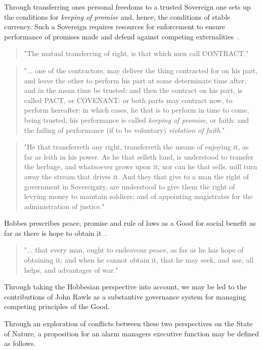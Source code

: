 \documentclass[11pt, oneside]{book}   	%
\begin{document}
Through transferring ones personal freedoms to a trusted Sovereign one sets up the conditions for \emph{keeping of promise} and, hence, the conditions of stable currency. Such a Sovereign requires resources for enforcement to ensure performance of promises made and defend against competing externalities~\cite{th1}.

\begin{quote}
"The mutual transferring of right, is that which men call CONTRACT."
\end{quote}
\begin{quote}
"... one of the contractors, may deliver the thing contracted for on his part, and leave the other to perform his part at some determinate time after, and in the mean time be trusted: and then the contract on his part, is called PACT, or COVENANT: or both parts may contract now, to perform hereafter: in which cases, he that is to perform in time to come, being trusted, his performance is called \emph{keeping of promise}, or faith: and the failing of performance (if to be voluntary) \emph{violation of faith}."
\end{quote}

\pagebreak

\begin{quote}
"He that transferreth any right, transferreth the means of enjoying it, as far as leith in his power. As he that selleth land, is understood to transfer the herbage, and whatsoever grows upon it; nor can he that sells. mill turn away the stream that drives it. And they that give to a man the right of government in Sovereignty, are understood to give them the right of levying money to maintain soldiers; and of appointing magistrates for the administration of justice."
\end{quote}

Hobbes prescribes peace, promise and rule of laws as a Good for social benefit as far as there is hope to obtain it~\cite{th1}.

\begin{quote}
"... that every man, ought to endeavour peace, as far as he has hope of obtaining it; and when he cannot obtain it, that he may seek, and use, all helps, and advantages of war."
\end{quote}
Through taking the Hobbesian perspective into account, we may be led to the contributions of John Rawls as a substantive governance system for managing competing principles of the Good.\

Through an exploration of conflicts between these two perspectives on the State of Nature, a proposition for an alarm managers executive function may be defined as follows.\
\end{document}
